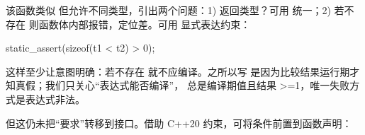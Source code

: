 该函数类似  但允许不同类型，引出两个问题：1) 返回类型？可用  统一；2) 若不存在 \cii{<} 则函数体内部报错，定位差。可用  显式表达约束：

\begin{code}
static_assert(sizeof(t1 < t2) > 0);
\end{code}

这样至少让意图明确：若不存在 \cii{<} 就不应编译。之所以写  是因为比较结果运行期才知真假；我们只关心“表达式能否编译”， 总是编译期值且结果 >=1，唯一失败方式是表达式非法。

但这仍未把“要求”转移到接口。借助 C++20 约束，可将条件前置到函数声明：

